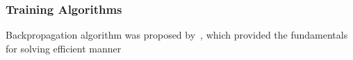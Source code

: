 \subsubsection{Training Algorithms}
Backpropagation algorithm was proposed by~\citet{werbos1975beyond}, which provided the fundamentals for solving  \computational efficient manner